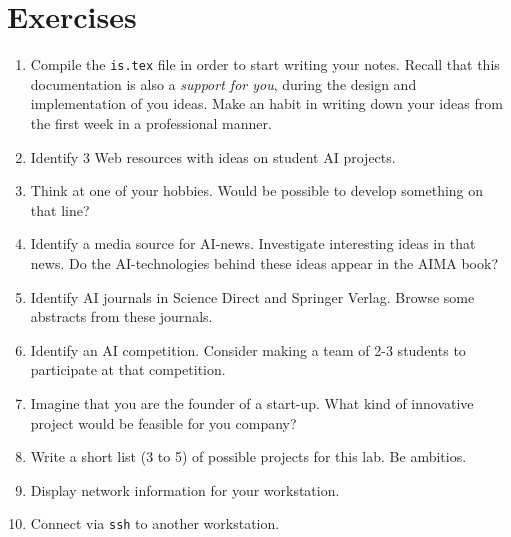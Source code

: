 \documentclass[a4paper,12pt]{report}
\begin{document}
\section{Exercises}
\begin{enumerate}
 \item Compile the \texttt{is.tex} file in order to start writing your notes. 
Recall that this documentation is also a \textit{support for you}, during the design and implementation of you ideas. 
Make an habit in writing down your ideas from the first week in a professional manner.
\item Identify 3 Web resources with ideas on student AI projects.
\item Think at one of your hobbies. Would be possible to develop something on that line?
\item Identify a media source for AI-news. Investigate interesting ideas in that news. 
Do the AI-technologies behind these ideas appear in the AIMA book?
\item Identify AI journals in Science Direct and Springer Verlag. Browse some abstracts from these journals.
\item Identify an AI competition. Consider making a team of 2-3 students to participate at that competition.
\item Imagine that you are the founder of a start-up. What kind of innovative project would be feasible for you company? 
\item Write a short list (3 to 5) of possible projects for this lab. Be ambitios. 
\item Display network information for your workstation.
\item Connect via \texttt{ssh} to another workstation. 
\end{enumerate}

\vspace{0.5cm}
\end{document}
